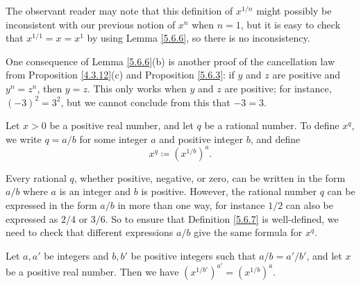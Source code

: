 \begin{note}
    The observant reader may note that this definition of \(x^{1 / n}\) might possibly be inconsistent with our previous notion of \(x^n\) when \(n = 1\), but it is easy to check that \(x^{1 / 1} = x = x^1\) by using Lemma \ref{5.6.6}, so there is no inconsistency.
\end{note}

\begin{note}
    One consequence of Lemma \ref{5.6.6}(b) is another proof of the cancellation law from Proposition \ref{4.3.12}(c) and Proposition \ref{5.6.3}:
    if \(y\) and \(z\) are positive and \(y^n = z^n\), then \(y = z\).
    This only works when \(y\) and \(z\) are positive;
    for instance, \((-3)^2 = 3^2\), but we cannot conclude from this that \(-3 = 3\).
\end{note}

\begin{definition}\label{5.6.7}
    Let \(x > 0\) be a positive real number, and let \(q\) be a rational number.
    To define \(x^q\), we write \(q = a / b\) for some integer \(a\) and positive integer \(b\), and define
    \[
        x^q \coloneqq (x^{1 / b})^a.
    \]
\end{definition}

\begin{note}
    Every rational \(q\), whether positive, negative, or zero, can be written in the form \(a / b\) where \(a\) is an integer and \(b\) is positive.
    However, the rational number \(q\) can be expressed in the form \(a / b\) in more than one way, for instance \(1 / 2\) can also be expressed as \(2 / 4\) or \(3 / 6\).
    So to ensure that Definition \ref{5.6.7} is well-defined, we need to check that different expressions \(a / b\) give the same formula for \(x^q\).
\end{note}

\begin{lemma}\label{5.6.8}
    Let \(a, a'\) be integers and \(b, b'\) be positive integers such that \(a / b = a' / b'\), and let \(x\) be a positive real number.
    Then we have \((x^{1 / b'})^{a'} = (x^{1 / b})^a\).
\end{lemma}


